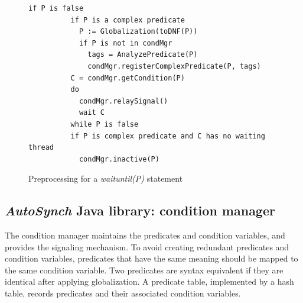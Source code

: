 \documentclass[preprint]{sigplanconf}
\begin{document}
\begin{figure}[ht!]
    \begin{Verbatim}[fontsize=\footnotesize,gobble=8,frame=lines,
            framesep=3mm]
        if P is false 
          if P is a complex predicate 
            P := Globalization(toDNF(P))
            if P is not in condMgr
              tags = AnalyzePredicate(P)
              condMgr.registerComplexPredicate(P, tags)
          C = condMgr.getCondition(P)
          do 
            condMgr.relaySignal()
            wait C
          while P is false
          if P is complex predicate and C has no waiting thread
            condMgr.inactive(P) 
    \end{Verbatim}
    \caption{Preprocessing for a {\em waituntil(P)} statement}
  \label{fig:prep}
\end{figure}  


%
%


\subsection{{\em AutoSynch} Java library: condition manager}
The condition manager maintains the predicates and condition variables, and
provides the signaling mechanism. To avoid creating redundant predicates and 
condition variables, predicates that have the same meaning should be mapped to 
the same condition variable. Two predicates are syntax equivalent if they 
are identical after applying globalization. A predicate table, implemented by a
hash table, records predicates and their associated condition variables. 
\end{document}
